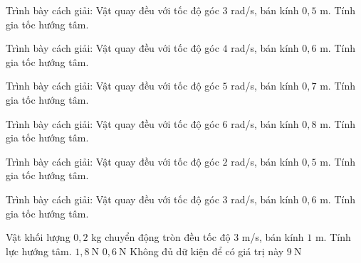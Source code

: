 \begin{bt}
Trình bày cách giải: Vật quay đều với tốc độ góc $3$ rad/s, bán kính $0,5$ m. Tính gia tốc hướng tâm.
\end{bt}

\begin{bt}
Trình bày cách giải: Vật quay đều với tốc độ góc $4$ rad/s, bán kính $0,6$ m. Tính gia tốc hướng tâm.
\end{bt}

\begin{bt}
Trình bày cách giải: Vật quay đều với tốc độ góc $5$ rad/s, bán kính $0,7$ m. Tính gia tốc hướng tâm.
\end{bt}

\begin{bt}
Trình bày cách giải: Vật quay đều với tốc độ góc $6$ rad/s, bán kính $0,8$ m. Tính gia tốc hướng tâm.
\end{bt}

\begin{bt}
Trình bày cách giải: Vật quay đều với tốc độ góc $2$ rad/s, bán kính $0,5$ m. Tính gia tốc hướng tâm.
\end{bt}

\begin{bt}
Trình bày cách giải: Vật quay đều với tốc độ góc $3$ rad/s, bán kính $0,6$ m. Tính gia tốc hướng tâm.
\end{bt}

\begin{ex}
Vật khối lượng $0,2$ kg chuyển động tròn đều tốc độ $3$ m/s, bán kính $1$ m. Tính lực hướng tâm.
\choice
{\True $1,8\ \mathrm{N}$}
{$0,6\ \mathrm{N}$}
{Không đủ dữ kiện để có giá trị này}
{$9\ \mathrm{N}$}
\end{ex}

